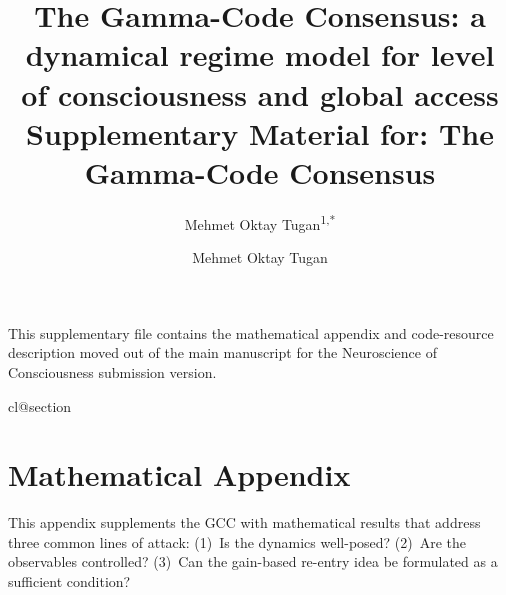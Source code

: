 \documentclass[11pt,a4paper]{article}
\title{%
  \textbf{The Gamma-Code Consensus: a dynamical regime model for level of consciousness and global access}
}
\author{%
  Mehmet Oktay Tugan\textsuperscript{1,*}
}
\date{}
\title{\textbf{Supplementary Material for: The Gamma-Code Consensus}}
\author{Mehmet Oktay Tugan}
\date{}
\theoremstyle{plain}
\theoremstyle{definition}
\theoremstyle{remark}
\begin{document}
\maketitle
\noindent This supplementary file contains the mathematical appendix and code-resource description moved out of the main manuscript for the Neuroscience of Consciousness submission version.

\appendix
\makeatletter
\providecommand*{\@removefromreset}[2]{%
  \let\@tempa\@elt
  \let\@elt\relax
  \expandafter\let\expandafter\@tempb\csname cl@#2\endcsname
  \expandafter\def\csname cl@#2\endcsname{}%
  \def\@elt##1{%
    \ifx ##1#1\else
      \expandafter\@temptokena\expandafter{\csname cl@#2\endcsname}%
      \edef\x{\noexpand\expandafter\noexpand\def\noexpand\csname cl@#2\noexpand\endcsname{\the\@temptokena \noexpand\@elt{##1}}}\x
    \fi}%
  \@tempb
  \let\@elt\@tempa}
\@removefromreset{theorem}{section}
\makeatother
\section*{Mathematical Appendix}
\label{sec:appendix}
\setcounter{section}{0}
\setcounter{theorem}{0}
\renewcommand{\thesection}{A.\arabic{section}}
\renewcommand{\thesubsection}{A.\arabic{section}.\arabic{subsection}}
\renewcommand{\thetheorem}{A.\arabic{theorem}}

\titleformat{\section}{\large\bfseries}{\thesection}{0.6em}{}
\titlespacing*{\section}{0pt}{1.5em}{0.8em}


This appendix supplements the GCC with mathematical results that address three common lines of attack: (1)~Is the dynamics well-posed? (2)~Are the observables controlled? (3)~Can the gain-based re-entry idea be formulated as a sufficient condition?
\end{document}
